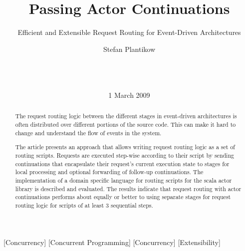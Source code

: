 \documentclass{sig-alternate}
\begin{document}

\title{Passing Actor Continuations}
\subtitle{Efficient and Extensible Request Routing for Event-Driven Architectures}


\author{
\alignauthor
Stefan Plantikow\\
       \\
       \\
       \\
}

\date{1 March 2009}


\maketitle

\begin{abstract}

The request routing logic between the different stages in event-driven architectures is often
distributed over different portions of the source code. This can make it hard to change and
understand the flow of events in the system.

The article presents an approach that allows writing request routing logic as a set of routing
scripts. Requests are executed step-wise according to their script by sending continuations that
encapsulate their request's current execution state to stages for local processing and optional
forwarding of follow-up continuations. The implementation of a domain specific language for routing
scripts for the scala actor library is described and evaluated. The results indicate that request
routing with actor continuations performs about equally or better to using separate stages for
request routing logic for scripts of at least 3 sequential steps.

\end{abstract}

[Concurrency]         
[Concurrent Programming]         
[Concurrency]
[Extensibility]

\end{document}
